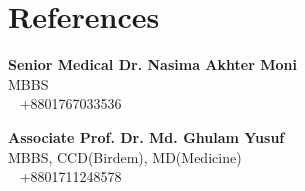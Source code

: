 \documentclass[english]{cv-style}     %
\begin{document}
\vspace{-2mm}


\section{References}
  \vspace{-0.3cm}
\begin{minipage}{0.45\textwidth}
\textbf{Senior Medical Dr. Nasima Akhter Moni } \\
MBBS\\
\phone ~ +8801767033536
\end{minipage}%
\hfill
\begin{minipage}{0.45\textwidth}
\textbf{Associate Prof. Dr. Md. Ghulam Yusuf } \\
MBBS, CCD(Birdem), MD(Medicine) \\
\phone ~ +8801711248578
\end{minipage}%
\end{document}
